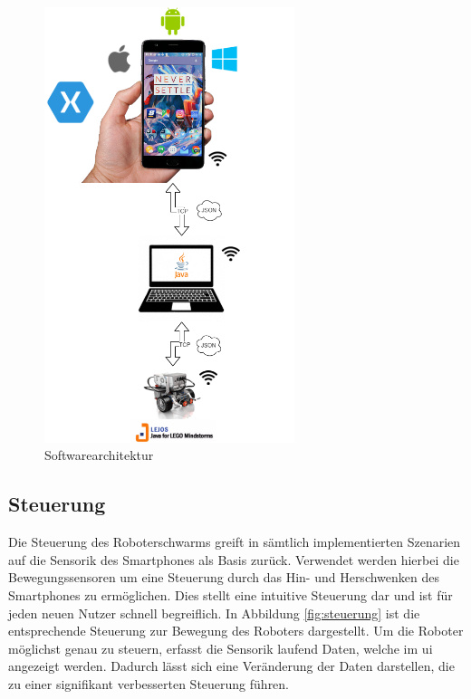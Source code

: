 \newpage
\begin{verbatim}
\end{verbatim}
\begin{figure}[h]
	\centering
	\includegraphics[width=0.65\textwidth]{images/konzeption/Softwarearchitecture.png}
	\caption{Softwarearchitektur}
	\label{fig:softwarearchitecture}
\end{figure}

\newpage
\subsection{Steuerung}

Die Steuerung des Roboterschwarms greift in sämtlich implementierten Szenarien auf die Sensorik des Smartphones als Basis zurück. Verwendet werden hierbei die Bewegungssensoren um eine Steuerung durch das Hin- und Herschwenken des Smartphones zu ermöglichen. Dies stellt eine intuitive Steuerung dar und ist für jeden neuen Nutzer schnell begreiflich. In Abbildung \ref{fig:steuerung} ist die entsprechende Steuerung zur Bewegung des Roboters dargestellt. Um die Roboter möglichst genau zu steuern, erfasst die Sensorik laufend Daten, welche im \gls{ui} angezeigt werden. Dadurch lässt sich eine Veränderung der Daten darstellen, die zu einer signifikant verbesserten Steuerung führen.\\

